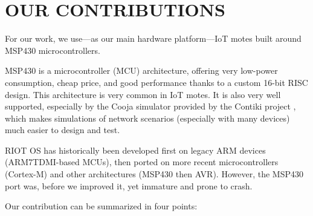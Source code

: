 \documentclass[a4paper,twoside]{article}
\begin{document}

\section{\uppercase{Our contributions}}

For our work, we use---as our main hardware platform---IoT motes built
around MSP430 microcontrollers.

MSP430 is a microcontroller (MCU) architecture, offering very low-power
consumption, cheap price, and good performance thanks to a custom 16-bit
RISC design. This architecture is very common in IoT motes.
It is also very well supported, especially by the Cooja simulator
provided by the Contiki project \cite{Cooja}, which makes simulations
of network scenarios (especially with many devices) much easier
to design and test.

RIOT OS has historically been developed first on legacy ARM devices
(ARM7TDMI-based MCUs), then ported on more recent microcontrollers
(Cortex-M) and other architectures (MSP430 then AVR). However, the
MSP430 port was, before we improved it, yet immature and prone
to crash.

Our contribution can be summarized in four points:
\end{document}

